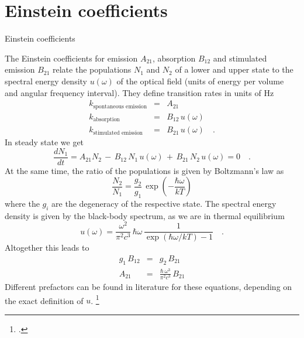 \section{Einstein coefficients}

\begin{marginfigure}

  \caption{Einstein coefficients}
\end{marginfigure}


The Einstein coefficients for emission $A_{21}$, absorption $B_{12}$ and stimulated emission $B_{21}$ relate the populations $N_1$ and $N_2$ of a lower and upper state to the spectral energy density $u(\omega)$ of the optical field (units of energy per volume and angular frequency interval). They define transition rates in units of Hz
\begin{eqnarray}
 k_{\text{spontaneous emission}} &=& A_{21} \\
  k_{\text{absorption}}  & = & B_{12} \,   u(\omega) \\
  k_{\text{stimulated emission }} & =&  B_{21} \,  u(\omega)  \quad .
\end{eqnarray}
%
In steady state we get
\begin{equation}
 \frac{d N_1}{dt} =  A_{21} N_2 \, - \, B_{12} \, N_1 \, u(\omega) \, + \, B_{21}\, N_2 \,u(\omega)  = 0 \quad .
\end{equation}
At the same time, the ratio of the populations is given by Boltzmann's law as
\begin{equation}
 \frac{N_2}{N_1} = \frac{g_2}{g_1} \, \exp \left( - \frac{\hbar \omega}{kT} \right)
\end{equation}
where the $g_i$ are the degeneracy of the respective state. The spectral energy density is given by the black-body spectrum, as we are in thermal equilibrium
\begin{equation}
 u(\omega) = \frac{\omega^2}{\pi^2 c^3} \, \hbar \omega \, \frac{1}{\exp \left( \hbar \omega / kT \right) - 1} \quad .
\end{equation}
Altogether this leads to 
\begin{eqnarray}
 g_1 \, B_{12} &=& g_2 \, B_{21} \\
 A_{21} &=&  \frac{\hbar \, \omega^3}{\pi^2 c^3} \, B_{21} 
\end{eqnarray}
Different prefactors can be found in literature for these equations, depending on the exact definition of $u$.
 \footcite{Hilborn:2002wj} 

